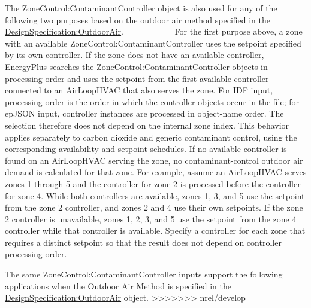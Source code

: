 The ZoneControl:ContaminantController object is also used for any of the following two purposes based on the outdoor air method specified in the \hyperref[designspecificationoutdoorair]{DesignSpecification:OutdoorAir}.
=======
For the first purpose above, a zone with an available ZoneControl:ContaminantController uses the setpoint specified by its own controller. If the zone does not have an available controller, EnergyPlus searches the ZoneControl:ContaminantController objects in processing order and uses the setpoint from the first available controller connected to an \hyperref[airloophvac]{AirLoopHVAC} that also serves the zone. For IDF input, processing order is the order in which the controller objects occur in the file; for epJSON input, controller instances are processed in object-name order. The selection therefore does not depend on the internal zone index. This behavior applies separately to carbon dioxide and generic contaminant control, using the corresponding availability and setpoint schedules. If no available controller is found on an AirLoopHVAC serving the zone, no contaminant-control outdoor air demand is calculated for that zone. For example, assume an AirLoopHVAC serves zones 1 through 5 and the controller for zone 2 is processed before the controller for zone 4. While both controllers are available, zones 1, 3, and 5 use the setpoint from the zone 2 controller, and zones 2 and 4 use their own setpoints. If the zone 2 controller is unavailable, zones 1, 2, 3, and 5 use the setpoint from the zone 4 controller while that controller is available. Specify a controller for each zone that requires a distinct setpoint so that the result does not depend on controller processing order.

The same ZoneControl:ContaminantController inputs support the following applications when the Outdoor Air Method is specified in the \hyperref[designspecificationoutdoorair]{DesignSpecification:OutdoorAir} object.
>>>>>>> nrel/develop

